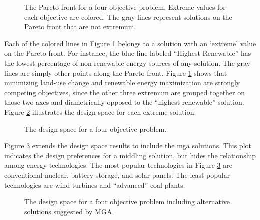 \begin{figure}[h]
  \centering
  \resizebox{\columnwidth}{!}{}
  \caption{The Pareto front for a four objective problem. Extreme values for each
  objective are colored. The gray lines represent solutions on the Pareto front 
  that are not extremum.}
  \label{fig:4-obj-pareto}
\end{figure}

Each of the colored lines in Figure \ref{fig:4-obj-pareto} belongs to a solution with an
`extreme' value on the Pareto-front. For instance, the blue line labeled ``Highest Renewable''
has the lowest percentage of non-renewable energy sources of any solution. The gray lines 
are simply other points along the Pareto-front. Figure \ref{fig:4-obj-pareto} shows that minimizing 
land-use change and renewable energy maximization are strongly competing objectives, since the
other three extremum are grouped together on those two axes and diametrically opposed to the 
``highest renewable'' solution. Figure \ref{fig:4-obj-design} illustrates the design space for
each extreme solution. 


\begin{figure}[h]
  \centering
  \resizebox{\columnwidth}{!}{}
  \caption{The design space for a four objective problem.}
  \label{fig:4-obj-design}
\end{figure}

Figure \ref{fig:4-obj-design-mga} extends the design space results to include the \ac{mga} solutions. 
This plot indicates the design preferences for a middling solution, but hides the relationship among
energy technologies. The most popular technologies in Figure \ref{fig:4-obj-design-mga} are conventional
nuclear, battery storage, and solar panels. The least popular technologies are wind turbines and ``advanced''
coal plants.

\begin{figure}[h]
  \centering
  \resizebox{\columnwidth}{!}{}
  \caption{The design space for a four objective problem including alternative solutions suggested by MGA.}
  \label{fig:4-obj-design-mga}
\end{figure}